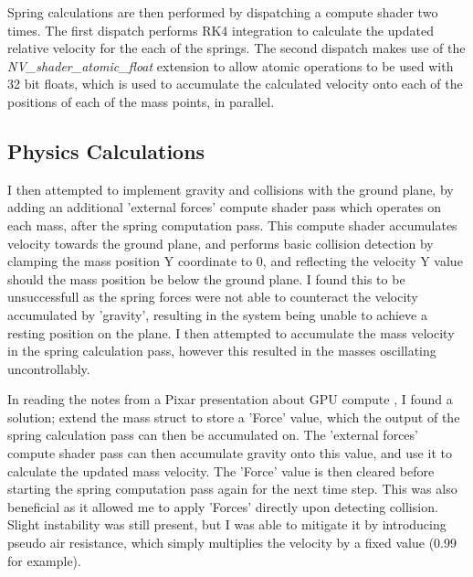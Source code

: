 \documentclass[]{acmsiggraph}
\begin{document}
Spring calculations are then performed by dispatching a compute shader two times. The first dispatch performs RK4 integration to calculate the updated relative velocity for the each of the springs. The second dispatch makes use of the \textit{NV_shader_atomic_float} extension to allow atomic operations to be used with 32 bit floats, which is used to accumulate the calculated velocity onto each of the positions of each of the mass points, in parallel.

\subsection{Physics Calculations} \label{sec:physics}

I then attempted to implement gravity and collisions with the ground plane, by adding an additional 'external forces' compute shader pass which operates on each mass, after the spring computation pass. This compute shader accumulates velocity towards the ground plane, and performs basic collision detection by clamping the mass position Y coordinate to 0, and reflecting the velocity Y value should the mass position be below the ground plane. I found this to be unsuccessfull as the spring forces were not able to counteract the velocity accumulated by 'gravity', resulting in the system being unable to achieve a resting position on the plane. I then attempted to accumulate the mass velocity in the spring calculation pass, however this resulted in the masses oscillating uncontrollably.

In reading the notes from a Pixar presentation about GPU compute \cite{siggraphPixar}, I found a solution; extend the mass struct to store a 'Force' value, which the output of the spring calculation pass can then be accumulated on. The 'external forces' compute shader pass can then accumulate gravity onto this value, and use it to calculate the updated mass velocity. The 'Force' value is then cleared before starting the spring computation pass again for the next time step. This was also beneficial as it allowed me to apply 'Forces' directly upon detecting collision. Slight instability was still present, but I was able to mitigate it by introducing pseudo air resistance, which simply multiplies the velocity by a fixed value (0.99 for example).
\end{document}
